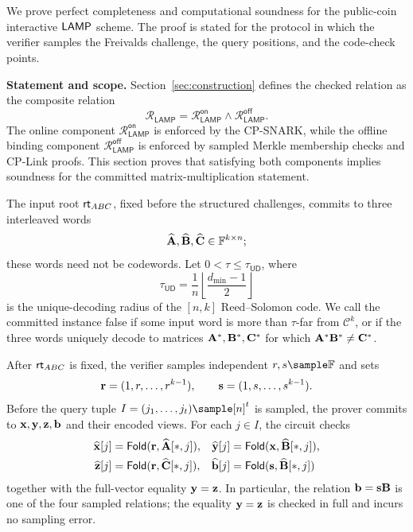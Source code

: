 \section[Security Analysis]{}
\label{sec:security}

\begin{revblock}
We prove perfect completeness and computational soundness for the public-coin
interactive \(\textsf{LAMP}\) scheme.  The proof is stated for the protocol in which
the verifier samples the Freivalds challenge, the query positions, and the
code-check points.

\noindent\textbf{Statement and scope.}
Section~\ref{sec:construction} defines the checked relation as the composite
relation
\[
  \mathcal{R}_{\mathsf{LAMP}}
  =
  \mathcal{R}_{\mathsf{LAMP}}^{\mathsf{on}}
  \land
  \mathcal{R}_{\mathsf{LAMP}}^{\mathsf{off}}.
\]
The online component
\(\mathcal{R}_{\mathsf{LAMP}}^{\mathsf{on}}\) is enforced by the CP-SNARK,
while the offline binding component
\(\mathcal{R}_{\mathsf{LAMP}}^{\mathsf{off}}\) is enforced by sampled Merkle
membership checks and CP-Link proofs.  This section proves that satisfying both
components implies soundness for the committed matrix-multiplication statement.

The input root \(\textsf{rt}_{ABC}\), fixed before the structured challenges, commits
to three interleaved words
\[
  \widehat{\mathbf A},\widehat{\mathbf B},\widehat{\mathbf C}
  \in\mathbb F^{k\times n};
\]
these words need not be codewords.  Let \(0<\tau\le\tau_{\mathsf{UD}}\), where
\[
  \tau_{\mathsf{UD}}
  =\frac{1}{n}\left\lfloor\frac{d_{\min}-1}{2}\right\rfloor
\]
is the unique-decoding radius of the \([n,k]\) Reed--Solomon code.  We call the
committed instance false if some input word is more than \(\tau\)-far from
\(\mathcal C^k\), or if the three words uniquely decode to matrices
\(\mathbf A^*,\mathbf B^*,\mathbf C^*\) for which
\(\mathbf A^*\mathbf B^*\ne\mathbf C^*\).

After \(\textsf{rt}_{ABC}\) is fixed, the verifier samples independent
\(r,s\sample\mathbb F\) and sets
\[
  \mathbf r=(1,r,\ldots,r^{k-1}),\qquad
  \mathbf s=(1,s,\ldots,s^{k-1}).
\]
Before the query tuple \(I=(j_1,\ldots,j_t)\sample[n]^t\) is sampled, the
prover commits to \(\mathbf x,\mathbf y,\mathbf z,\mathbf b\) and their encoded views.
For each \(j\in I\), the circuit checks
\[
\begin{aligned}
 \widehat{\mathbf x}[j]&=\textsf{Fold}(\mathbf r,\widehat{\mathbf A}[*,j]),&
 \widehat{\mathbf y}[j]&=\textsf{Fold}(\mathbf x,\widehat{\mathbf B}[*,j]),\\
 \widehat{\mathbf z}[j]&=\textsf{Fold}(\mathbf r,\widehat{\mathbf C}[*,j]),&
 \widehat{\mathbf b}[j]&=\textsf{Fold}(\mathbf s,\widehat{\mathbf B}[*,j])
\end{aligned}
\]
together with the full-vector equality \(\mathbf y=\mathbf z\).  In particular,
the relation \(\mathbf b=\mathbf s\mathbf B\) is one of the four sampled relations;
the equality \(\mathbf y=\mathbf z\) is checked in full and incurs no sampling
error.


\end{revblock}
